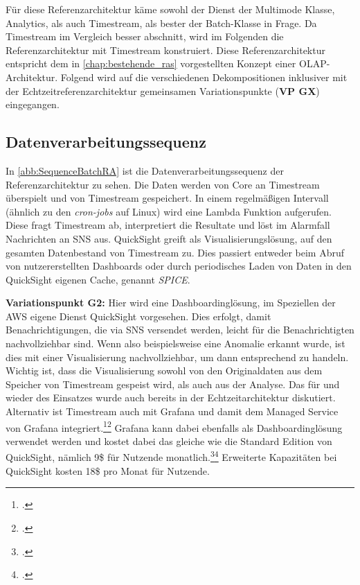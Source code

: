 Für diese Referenzarchitektur käme sowohl der Dienst der Multimode Klasse, \AWSIOT{} Analytics, als auch Timestream, als bester der Batch-Klasse in Frage. Da Timestream im Vergleich besser abschnitt, wird im Folgenden die Referenzarchitektur mit Timestream konstruiert.
Diese Referenzarchitektur entspricht dem in \autoref{chap:bestehende_ras} vorgestellten Konzept einer \ac{OLAP}-Architektur. Folgend wird auf die verschiedenen Dekompositionen inklusiver mit der Echtzeitreferenzarchitektur gemeinsamen Variationspunkte (\textbf{VP GX}) eingegangen.

\subsection{Datenverarbeitungssequenz}\label{subsection:Datenverarbeitungssequen-B}
In \autoref{abb:SequenceBatchRA} ist die Datenverarbeitungssequenz der Referenzarchitektur zu sehen. Die Daten werden von \AWSIOT{} Core an Timestream überspielt und von Timestream gespeichert. In einem regelmäßigen Intervall (ähnlich zu den \textit{cron-jobs} auf Linux) wird eine Lambda Funktion aufgerufen. Diese fragt Timestream ab, interpretiert die Resultate und löst im Alarmfall Nachrichten an \ac{SNS} aus. QuickSight greift als Visualisierungslösung, auf den gesamten Datenbestand von Timestream zu. Dies passiert entweder beim Abruf von nutzererstellten Dashboards oder durch periodisches Laden von Daten in den QuickSight eigenen Cache, genannt \textit{SPICE}.

\textbf{Variationspunkt G2:} Hier wird eine Dashboardinglösung, im Speziellen der \ac{AWS} eigene Dienst QuickSight vorgesehen. Dies erfolgt, damit Benachrichtigungen, die via \ac{SNS} versendet werden, leicht für die Benachrichtigten nachvollziehbar sind. Wenn also beispielsweise eine Anomalie erkannt wurde, ist dies mit einer Visualisierung nachvollziehbar, um dann entsprechend zu handeln. Wichtig ist, dass die Visualisierung sowohl von den Originaldaten aus dem Speicher von Timestream gespeist wird, als auch aus der Analyse. Das für und wieder des Einsatzes wurde auch bereits in  der Echtzeitarchitektur diskutiert. Alternativ ist Timestream auch mit Grafana und damit dem Managed Service von Grafana integriert.\footcite[Vgl.][]{AmazonWebServicesInc..o.J.bm}\nzitat\footcite[Vgl.][]{Dutt.2020} Grafana kann dabei ebenfalls als Dashboardinglösung verwendet werden und kostet dabei das gleiche wie die Standard Edition von QuickSight, nämlich 9\$ für Nutzende monatlich.\footcite[Vgl. auch im Foglenden][]{AmazonWebServicesInc..o.J.bn}\nzitat\footcite[Vgl.][]{AmazonWebServicesInc..o.J.bo} Erweiterte Kapazitäten bei QuickSight kosten 18\$ pro Monat für Nutzende. 

